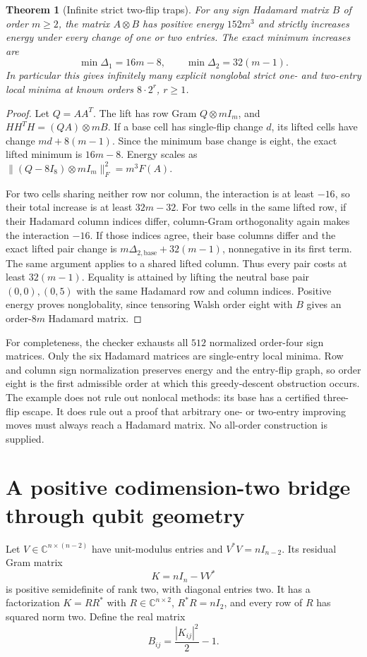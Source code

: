 \documentclass[11pt]{article}
\newtheorem{theorem}{Theorem}[section]
\begin{document}
\begin{theorem}[Infinite strict two-flip traps]
\label{thm:spectral-tensor-discrete-traps}
For any sign Hadamard matrix $B$ of order $m\ge2$, the matrix
$A\otimes B$ has positive energy $152m^3$ and strictly increases energy
under every change of one or two entries. The exact minimum increases are
\[
 \min\Delta_1=16m-8,\qquad \min\Delta_2=32(m-1).
\]
In particular this gives infinitely many explicit nonglobal strict
one- and two-entry local minima at known orders $8\cdot2^r$, $r\ge1$.
\end{theorem}
\begin{proof}
Let $Q=AA^T$. The lift has row Gram $Q\otimes mI_m$, and
$HH^TH=(Q A)\otimes mB$. If a base cell has single-flip change $d$,
its lifted cells have change $md+8(m-1)$. Since the minimum base change
is eight, the exact lifted minimum is $16m-8$.
Energy scales as
$\|(Q-8I_8)\otimes mI_m\|_F^2=m^3F(A)$.

For two cells sharing neither row nor column, the interaction is at
least $-16$, so their total increase is at least $32m-32$.
For two cells in the same lifted row, if their Hadamard column indices
differ, column-Gram orthogonality again makes the interaction $-16$.
If those indices agree, their base columns differ and the exact lifted
pair change is $m\Delta_{2,\mathrm{base}}+32(m-1)$, nonnegative in its
first term. The same argument applies to a shared lifted column.
Thus every pair costs at least $32(m-1)$. Equality is attained by lifting
the neutral base pair $(0,0),(0,5)$ with the same Hadamard row and column
indices. Positive energy proves nonglobality, since tensoring Walsh order eight with $B$ gives an order-$8m$
Hadamard matrix.
\end{proof}

For completeness, the checker exhausts all $512$ normalized order-four
sign matrices. Only the six Hadamard matrices are single-entry local
minima. Row and column sign normalization preserves energy and the
entry-flip graph, so order eight is the first admissible order at which
this greedy-descent obstruction occurs. The example does not rule out
nonlocal methods: its base has a certified three-flip escape. It does
rule out a proof that arbitrary one- or two-entry improving moves must
always reach a Hadamard matrix. No all-order construction is supplied.
\section{A positive codimension-two bridge through qubit geometry}
Let $V\in\mathbb C^{n\times(n-2)}$ have unit-modulus entries and
$V^*V=nI_{n-2}$. Its residual Gram matrix
\[
 K=nI_n-VV^*
\]
is positive semidefinite of rank two, with diagonal entries two.
It has a factorization $K=RR^*$ with $R\in\mathbb C^{n\times2}$,
$R^*R=nI_2$, and every row of $R$ has squared norm two.
Define the real matrix
\[
 B_{ij}=\frac{|K_{ij}|^2}{2}-1.
\]
\end{document}
